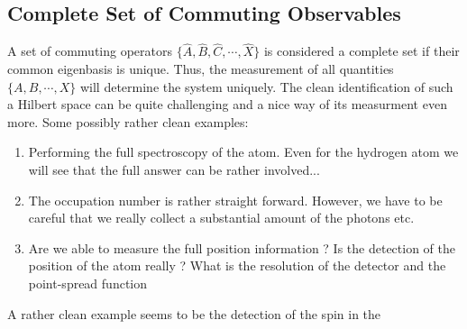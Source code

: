 \subsection{Complete Set of Commuting Observables}

A set of commuting operators $\{\hat{A},\hat{B},\hat{C},\cdots,\hat{X}\}$ is considered a complete set if their common eigenbasis is unique. Thus, the measurement of all quantities $\{A,B,\cdots,X\}$ will determine the system uniquely. The clean identification of such a Hilbert space can be quite challenging and a nice way of its measurment even more. Some possibly rather clean examples:

\begin{enumerate}
\item Performing the full spectroscopy of the atom. Even for the hydrogen atom we will see that the full answer can be rather involved...
\item The occupation number is rather straight forward. However, we have to be careful that we really collect a substantial amount of the photons etc.
\item Are we able to measure the full position information ? Is the detection of the position of the atom really ? What is the resolution of the detector and the point-spread function 
\end{enumerate}

A rather clean example seems to be the detection of the spin in the 